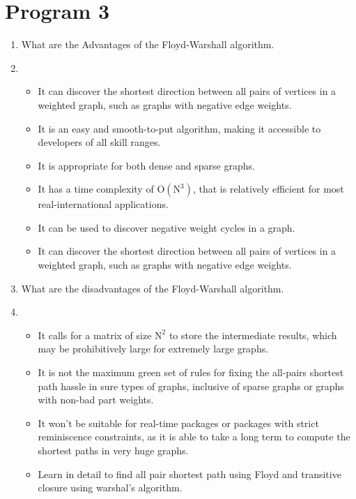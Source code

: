﻿\documentclass{article}
\newcommand{\answer}{\item [$\rightarrow$]}
\begin{document}
	\section*{Program 3}  
	\begin{enumerate}
		\item What are the Advantages of the Floyd-Warshall algorithm.
		\answer \begin{itemize}
			\item It can discover the shortest direction between all pairs of vertices in a weighted graph, such as graphs with negative edge weights.
			\item It is an easy and smooth-to-put algorithm, making it accessible to developers of all skill ranges.
			\item It is appropriate for both dense and sparse graphs.
			\item It has a time complexity of $\text{O}(\text{N}^3)$, that is relatively efficient for most real-international applications.
			\item It can be used to discover negative weight cycles in a graph.
			\item It can discover the shortest direction between all pairs of vertices in a weighted graph, such as graphs with negative edge weights.
		\end{itemize}
		
		\item What are the disadvantages of the Floyd-Warshall algorithm.
		\answer \begin{itemize}
			\item It calls for a matrix of size $\text{N}^2$ to store the intermediate results, which may be prohibitively large for extremely large graphs.
			\item It is not the maximum green set of rules for fixing the all-pairs shortest path hassle in sure types of graphs, inclusive of sparse graphs or graphs with non-bad part weights.
			\item It won't be suitable for real-time packages or packages with strict reminiscence constraints, as it is able to take a long term to compute the shortest paths in very huge graphs.
			
			\item Learn in detail to find all pair shortest path using Floyd and transitive closure using warshal's algorithm.
		\end{itemize}
	\end{enumerate} \newpage
\end{document}

